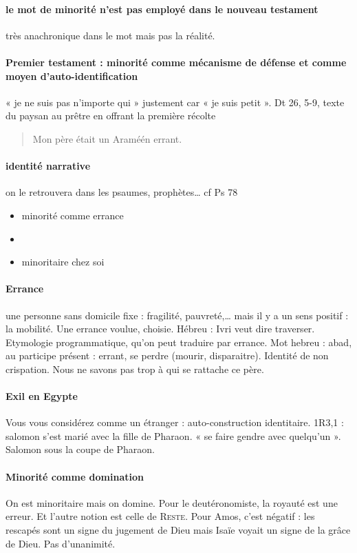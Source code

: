 \paragraph{le mot de minorité n’est pas employé dans le nouveau testament} très anachronique dans le mot mais pas la réalité.
\paragraph{Premier testament : minorité comme mécanisme de défense et comme moyen d’auto-identification} « je ne suis pas n’importe qui » justement car « je suis petit ». 
Dt 26, 5-9, texte du paysan au prêtre en offrant la première récolte
\begin{quote}
Mon père était un Araméén errant.
\end{quote}
\paragraph{identité narrative} on le retrouvera dans les psaumes, prophètes… cf Ps 78
\begin{itemize}
\item minorité comme errance
\item 
\item minoritaire chez soi
\end{itemize}
\paragraph{Errance} une personne sans domicile fixe : fragilité, pauvreté,… mais il y a un sens positif : la mobilité. Une errance voulue, choisie. Hébreu : Ivri veut dire traverser. Etymologie programmatique, qu’on peut traduire par errance. Mot hebreu : abad, au participe présent : errant, se perdre (mourir, disparaitre). Identité de non crispation. Nous ne savons pas trop à qui se rattache ce père. 
\paragraph{Exil en Egypte} Vous vous considérez comme un étranger : auto-construction identitaire. 1R3,1 : salomon s’est marié avec la fille de Pharaon. « se faire gendre avec quelqu’un ». Salomon sous la coupe de Pharaon. 

\paragraph{Minorité comme domination} On est minoritaire mais on domine. Pour le deutéronomiste, la royauté est une erreur. Et l’autre notion est celle de \textsc{Reste}. Pour Amos, c’est négatif : les rescapés sont un signe du jugement de Dieu mais Isaïe voyait un signe de la grâce de Dieu. Pas d’unanimité. 


